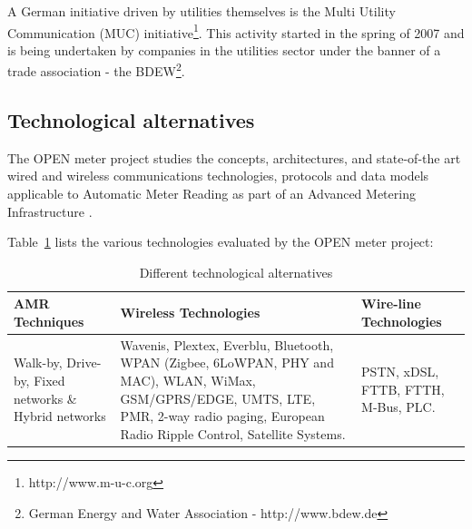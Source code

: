 A German initiative driven by utilities themselves is the Multi Utility Communication (MUC) initiative\footnote{http://www.m-u-c.org}. This activity started in the spring of 2007 and is being undertaken by companies in the utilities sector under the banner of a trade association - the BDEW\footnote{German Energy and Water Association - http://www.bdew.de}.

\subsection{Technological alternatives}

The OPEN meter project studies the concepts, architectures, and state-of-the art wired and wireless communications technologies, protocols and data models applicable to Automatic Meter Reading as part of an Advanced Metering Infrastructure \cite{OPEN_mtr_tech}.

Table~\ref{tab:OPEN_tech} lists the various technologies evaluated by the OPEN meter project:

\begin{table}[h!]
\begin{center}
\begin{tabular}{| p{3.5cm} | p{3.5cm} | p{3.5cm} |}
\hline
AMR Techniques & Wireless Technologies & Wire-line Technologies \\
\hline
Walk-by, Drive-by, Fixed networks \& Hybrid networks &  Wavenis, Plextex, Everblu, Bluetooth, WPAN (Zigbee, 6LoWPAN, PHY and MAC), WLAN, WiMax, GSM/GPRS/EDGE, UMTS, LTE, PMR, 2-way  radio paging, European Radio Ripple Control, Satellite Systems. & PSTN, xDSL, FTTB, FTTH, M-Bus, PLC.\\
\hline
\end{tabular}
\end{center}
\caption{Different technological alternatives}
\label{tab:OPEN_tech}
\end{table}


